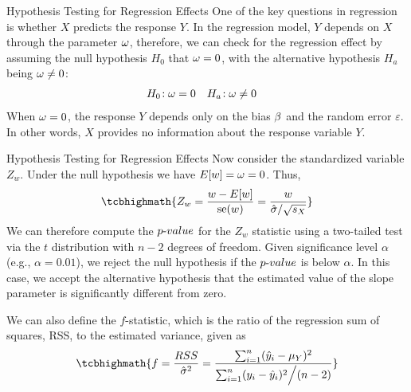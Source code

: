 %
%
\begin{frame}{Hypothesis Testing for Regression Effects}
One of the key questions in regression is whether $X$
predicts the response $Y$. In the regression model, 
$Y$ depends on $X$ through the parameter $\omega$, therefore, we can check
for the regression effect by 
assuming the null hypothesis $H_0$ that
$\omega=0$, with the alternative hypothesis $H_a$ being $\omega \ne 0$: 
\begin{align*}
    H_0\!: & \; \omega = 0 & H_a\!: & \; \omega \ne 0 
\end{align*}
When $\omega=0$, the response $Y$ depends only on the bias $\beta$ and the random
error $\varepsilon$. 
In other words, $X$ provides no information about the response
variable $Y$. 
\end{frame}
%
%
\begin{frame}{Hypothesis Testing for Regression Effects}
Now consider the standardized variable $Z_{w}$.%
Under
the null hypothesis we have $E[w] = \omega = 0$. Thus,
\begin{align*}
    \tcbhighmath{
    Z_{w} = \frac{w - E[w]}{\se(w)} = \frac{w}{ \hsigma / \sqrt{s_X}} }
\end{align*}
We can therefore compute the ${p\text{-}value}$ for the $Z_{w}$ statistic
using a two-tailed test via the $t$ distribution with $n-2$ degrees of freedom.
Given significance level $\alpha$ (e.g., $\alpha=0.01$),
we reject the null hypothesis if the ${p\text{-}value}$ is below $\alpha$.
In this case, we accept the
alternative hypothesis that the estimated value of the slope parameter
is significantly different from zero.

\medskip

We can also define the $f$-statistic, which is the ratio of the
regression sum of squares, RSS, to
the estimated variance, given as
\begin{align*}
    \tcbhighmath{
    f = \frac{RSS}{\hsigma^2} 
    = \frac{\sum_{i=1}^n (\hy_i - \mu_Y)^2}{\sum_{i=1}^n (y_i -
\hy_i)^2 \Big/ (n-2)}}
\end{align*}
\end{frame}

